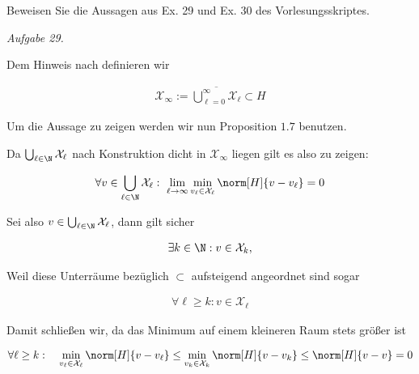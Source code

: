 
\begin{exercise}

Beweisen Sie die Aussagen aus Ex. 29 und Ex. 30 des Vorlesungsskriptes.

\end{exercise}


\begin{solution}

\textit{Aufgabe 29.}

Dem Hinweis nach definieren wir

\begin{align*}
  \mathcal{X}_\infty
  :=
  \overline{\bigcup_{\ell=0}^\infty \mathcal{X}_\ell}
  \subset H
\end{align*}

Um die Aussage zu zeigen werden wir nun Proposition $1.7$ benutzen.


Da $\bigcup_{\ell \in \N} \mathcal{X}_\ell$ nach Konstruktion dicht in $\mathcal{X}_\infty$ liegen gilt es also zu zeigen:

\begin{align*}
  \forall v \in \bigcup_{\ell \in \N} \mathcal{X}_\ell: ~
  \lim_{\ell \to \infty} \min_{v_\ell \in \mathcal{X}_\ell}
  \norm[H]{v - v_\ell} = 0
\end{align*}

Sei also $v \in \bigcup_{\ell \in \N} \mathcal{X}_\ell$, dann gilt sicher

\begin{align*}
  \exists k \in \N: v \in \mathcal{X}_k,
\end{align*}

Weil diese Unterräume bezüglich $\subset$ aufsteigend angeordnet sind sogar

\begin{align*}
  \forall \ell \geq k: v \in \mathcal{X}_\ell
\end{align*}

Damit schließen wir, da das Minimum auf einem kleineren Raum stets größer ist

\begin{align*}
  \forall \ell \geq k: \quad
  \min_{v_\ell \in \mathcal{X}_\ell} \norm[H]{v - v_\ell}
  \leq
  \min_{v_k \in \mathcal{X}_k} \norm[H]{v - v_k}
  \leq
  \norm[H]{v-v}
  =
  0
\end{align*}


\end{solution}
